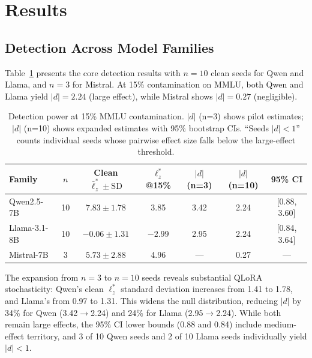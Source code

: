 \documentclass[11pt,a4paper]{article}
\begin{document}
\section{Results}
\label{sec:results}

\subsection{Detection Across Model Families}
\label{sec:results-families}

Table~\ref{tab:n10-expansion} presents the core detection results with $n=10$ clean seeds for Qwen and Llama, and $n=3$ for Mistral.
At 15\% contamination on MMLU, both Qwen and Llama yield $|d|=2.24$ (large effect), while Mistral shows $|d|=0.27$ (negligible).

\begin{table}[t]
\centering
\caption{Detection power at 15\% MMLU contamination. $|d|$ (n=3) shows pilot estimates; $|d|$ (n=10) shows expanded estimates with 95\% bootstrap CIs. ``Seeds $|d|{<}1$'' counts individual seeds whose pairwise effect size falls below the large-effect threshold.}
\label{tab:n10-expansion}
\small
\begin{tabular}{lcccccc}
\toprule
\textbf{Family} & \textbf{$n$} & \textbf{Clean $\bar{\ell}_z^{*}{\pm}\text{SD}$} & \textbf{$\ell_z^{*}$@15\%} & \textbf{$|d|$ (n=3)} & \textbf{$|d|$ (n=10)} & \textbf{95\% CI} \\
\midrule
Qwen2.5-7B    & 10 & $7.83\pm1.78$ & 3.85   & 3.42 & 2.24 & [0.88, 3.60] \\
Llama-3.1-8B  & 10 & $-0.06\pm1.31$ & $-2.99$ & 2.95 & 2.24 & [0.84, 3.64] \\
Mistral-7B    & 3  & $5.73\pm2.88$ & 4.96   & ---  & 0.27 & --- \\
\bottomrule
\end{tabular}
\end{table}

The expansion from $n=3$ to $n=10$ seeds reveals substantial QLoRA stochasticity: Qwen's clean $\ell_z^{*}$ standard deviation increases from 1.41 to 1.78, and Llama's from 0.97 to 1.31.
This widens the null distribution, reducing $|d|$ by 34\% for Qwen (3.42$\to$2.24) and 24\% for Llama (2.95$\to$2.24).
While both remain large effects, the 95\% CI lower bounds (0.88 and 0.84) include medium-effect territory, and 3 of 10 Qwen seeds and 2 of 10 Llama seeds individually yield $|d|<1$.
\end{document}
